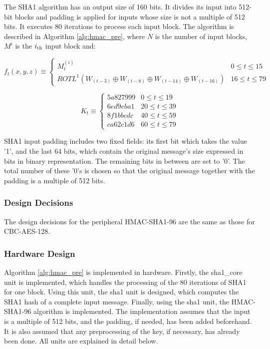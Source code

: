 The SHA1 algorithm has an output size of 160 bits. It divides its input into 512-bit blocks and padding is applied for inputs whose size is not a multiple of 512 bits. It executes 80 iterations to process each input block. The algorithm is described in Algorithm \ref{alg:hmac_pre}, where $N$ is the number of input blocks, $M^i$ is the $i\textsubscript{th}$ input block and:

\begin{equation}
f_t(x,y,z) \equiv 
\begin{cases}
      M_t^{(i)} & 0 \leq t \leq 15\\
      ROTL^1(W_(t-3)\oplus W_(t-8)\oplus W_(t-14)\oplus W_(t-16)) & 16 \leq t \leq 79
\end{cases} \end{equation} \label{eq:f_t}


\begin{equation}
K_t \equiv 
\begin{cases}
    5a827999 & 0 \leq t \leq 19\\ 
    6ed9eba1 & 20 \leq t \leq 39\\ 
    8f1bbcdc & 40 \leq t \leq 59 \\
    ca62c1d6 & 60 \leq t \leq 79 
\end{cases} \end{equation}\label{eq:K_t}

SHA1 input padding includes two fixed fields: its first bit which takes the value '1', and the last 64 bits, which contain the original message's size expressed in bits in binary representation. The remaining bits in between are set to '0'. The total number of these '0's is chosen so that the original message together with the padding is a multiple of 512 bits.

\subsubsection*{Design Decisions}
The design decisions for the peripheral HMAC-SHA1-96 are the same as those for CBC-AES-128.

\subsubsection*{Hardware Design}
Algorithm \ref{alg:hmac_pre} is implemented in hardware. Firstly, the sha1\_core unit is implemented, which handles the processing of the 80 iterations of SHA1 for one block. Using this unit, the sha1 unit is designed, which computes the SHA1 hash of a complete input message. Finally, using the sha1 unit, the HMAC-SHA1-96 algorithm is implemented. The implementation assumes that the input is a multiple of 512 bits, and the padding, if needed, has been added beforehand. It is also assumed that any preprocessing of the key, if necessary, has already been done. All units are explained in detail below.

